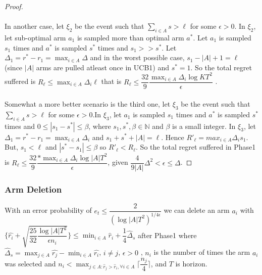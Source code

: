 \begin{proof}
\paragraph{}In another case, let $\xi_{2}$ be the event such that $\sum_{i\in A} s > \ell$ for some $\epsilon>0$.
In $\xi_{2}$, let sub-optimal arm $a_{1}$ is sampled more than optimal arm $a^{*}$. Let $a_{1}$ is sampled $s_{1}$ times and $a^{*}$ is sampled $s^{*}$ times and $s_{1}>>s^{*}$. Let $\Delta_{1}=r^{*}-r_{1}=\max_{i\in A}{\Delta}$ and in the worst possible case, $s_{1}-|A|+1=\ell$ (since $|A|$ arms are pulled atleast once in UCB1) and $s^{*}=1$. So the total regret suffered is $R_{\ell}\leq \max_{i\in A}{\Delta}_{i}\ell $ that is $R_{\ell}\leq \dfrac{32}{9}\dfrac{\max_{i\in A}{\Delta}_{i} \log KT^{2}}{\epsilon}$ .
\newline
\paragraph{}Somewhat a more better scenario is the third one, let $\xi_{3}$ be the event such that $\sum_{i\in A} s > \ell$ for some $\epsilon>0$.In $\xi_{3}$, let $a_{1}$ is sampled $s_{1}$ times and $a^{*}$ is sampled $s^{*}$ times and $0\leq |s_{1}-s^{*}|\leq\beta$, where $s_{1},s^{*},\beta\in \mathbb{N}$ and $\beta$ is a small integer. In $\xi_{3}$, let $\Delta_{1}=r^{*}-r_{1}=\max_{i\in A}{\Delta_{i}}$  and $s_{1}+s^{*}+|A|=\ell$. Hence $R'_{\ell}=max_{i\in A}{\Delta_{i}}s_{1}$. But, $s_{1}<\ell$ and $|s^{*}-s_{1}|\leq\beta $ so $R'_{\ell}<R_{\ell}$.
\newline
So the total regret suffered in Phase1 is $R_{\ell}\leq \dfrac{32}{9}\dfrac{ * \max_{i\in A}{\Delta}_{i} \log |A|T^{2}}{\epsilon}$, given $\dfrac{4}{9|A|}\Delta^{2}<\epsilon\leq \Delta$.
\end{proof}

\subsubsection{Arm Deletion}
\begin{theorem}
With an error probability of $e_{t}\leq \dfrac{2}{(\log |A|T^{2})^{1/4\epsilon}}$ 
we can delete an arm $a_{i}$ with $\bigg\lbrace\hat{r_{i}} + \sqrt{\dfrac{25}{32}\dfrac{\log{|A|T^{2}}}{\epsilon n_{i}}}\bigg\rbrace \leq \min_{i\in A}\hat{r}_{i}+\dfrac{1}{4} \hat{\Delta}_{s}$ after Phase1 where $\hat{\Delta}_{s}=\max_{j\in A}\hat{r_{j}} - \min_{i\in A}{\hat{r_{i}}}$, $i\neq j$, $\epsilon>0$ , $n_{i}$ is the number of times the arm $a_{i}$ was selected and $ n_{i} < \max_{j\in A:\hat{r}_{j}>\hat{r}_{i},\forall i\in A}\bigg\lceil\dfrac{{n_{j}}}{4}\bigg\rceil$, and $T$ is horizon.
\end{theorem}

